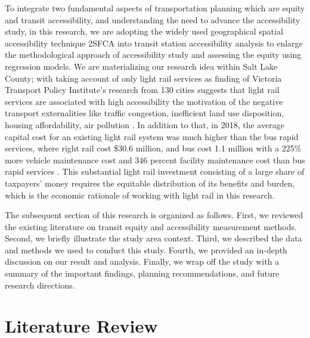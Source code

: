 \documentclass[numbered]{trbunofficial}
\begin{document}
To integrate two fundamental aspects of transportation planning which are equity and transit accessibility, and understanding the need to advance the accessibility study, in this research, we are adopting the widely used geographical spatial accessibility technique 2SFCA into transit station accessibility analysis to enlarge the methodological approach of accessibility study and assessing the equity using regression models.  We are materializing our research idea within Salt Lake County; with taking account of only light rail services as finding of Victoria Transport Policy Institute’s research from 130 cities suggests that light rail services are associated with high accessibility the motivation of the negative transport externalities like traffic congestion, inefficient land use disposition, housing affordability, air pollution \cite{Litman2012}.  In addition to that, in 2018, the average capital cost for an existing light rail system was much higher than the bus rapid services, where right rail cost \$30.6 million, and bus cost 1.1 million with a 225\% more vehicle maintenance cost and 346 percent facility maintenance cost than bus rapid services \cite{FederalTransitAdministration2019}.  This substantial light rail investment consisting of a large share of taxpayers’ money requires the equitable distribution of its benefits and burden, which is the economic rationale of working with light rail in this research.

The subsequent section of this research is organized as follows.  First, we reviewed the existing literature on transit equity and accessibility measurement methods.  Second, we briefly illustrate the study area context. Third, we described the data and methods we used to conduct this study.  Fourth, we provided an in-depth discussion on our result and analysis.  Finally, we wrap off the study with a summary of the important findings, planning recommendations, and future research directions.

\section{Literature Review}
\end{document}
